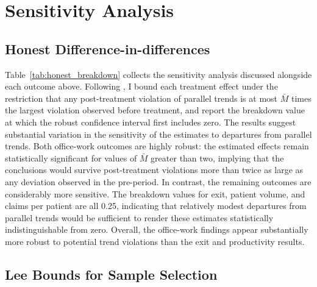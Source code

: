 \documentclass[12pt]{article}
\begin{document}
\section{Sensitivity Analysis}\label{app:sensitive}


\subsection{Honest Difference-in-differences}

Table~\ref{tab:honest_breakdown} collects the sensitivity analysis discussed alongside each outcome above. Following \citet{rambachan2019honest}, I bound each treatment effect under the restriction that any post-treatment violation of parallel trends is at most $\bar{M}$ times the largest violation observed before treatment, and report the breakdown value at which the robust confidence interval first includes zero. The results suggest substantial variation in the sensitivity of the estimates to departures from parallel trends. Both office-work outcomes are highly robust: the estimated effects remain statistically significant for values of $\bar{M}$ greater than two, implying that the conclusions would survive post-treatment violations more than twice as large as any deviation observed in the pre-period. In contrast, the remaining outcomes are considerably more sensitive. The breakdown values for exit, patient volume, and claims per patient are all 0.25, indicating that relatively modest departures from parallel trends would be sufficient to render these estimates statistically indistinguishable from zero. Overall, the office-work findings appear substantially more robust to potential trend violations than the exit and productivity results.



\subsection{Lee Bounds for Sample Selection}\label{sec:leebounds}
\end{document}
